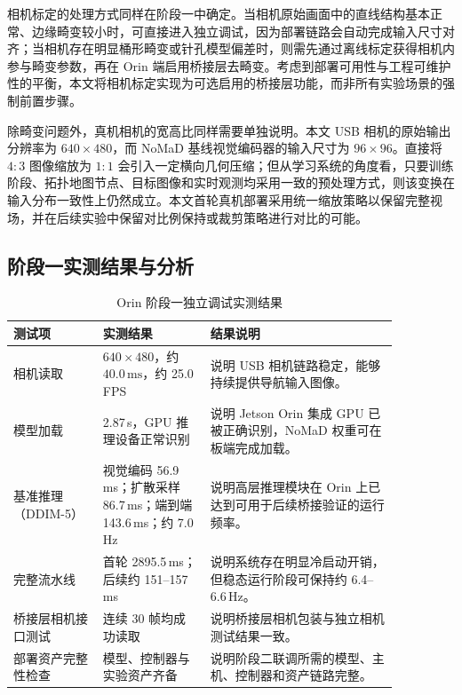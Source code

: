 相机标定的处理方式同样在阶段一中确定。当相机原始画面中的直线结构基本正常、边缘畸变较小时，可直接进入独立调试，因为部署链路会自动完成输入尺寸对齐；当相机存在明显桶形畸变或针孔模型偏差时，则需先通过离线标定获得相机内参与畸变参数，再在 Orin 端启用桥接层去畸变。考虑到部署可用性与工程可维护性的平衡，本文将相机标定实现为可选启用的桥接层功能，而非所有实验场景的强制前置步骤。

除畸变问题外，真机相机的宽高比同样需要单独说明。本文 USB 相机的原始输出分辨率为 $640\times480$，而 NoMaD 基线视觉编码器的输入尺寸为 $96\times96$。直接将 $4:3$ 图像缩放为 $1:1$ 会引入一定横向几何压缩；但从学习系统的角度看，只要训练阶段、拓扑地图节点、目标图像和实时观测均采用一致的预处理方式，则该变换在输入分布一致性上仍然成立。本文首轮真机部署采用统一缩放策略以保留完整视场，并在后续实验中保留对比例保持或裁剪策略进行对比的可能。

\subsection{阶段一实测结果与分析}


\begin{table}[htbp]
    \centering
    \caption{Orin 阶段一独立调试实测结果}
    \label{tab:orin-stage1-results}
    \begin{tabular}{p{0.20\linewidth}p{0.24\linewidth}p{0.42\linewidth}}
        \toprule
        测试项 & 实测结果 & 结果说明 \\
        \midrule
        相机读取 & $640\times480$，约 $40.0\,\mathrm{ms}$，约 25.0 FPS & 说明 USB
        相机链路稳定，能够持续提供导航输入图像。 \\
        模型加载 & 2.87\,s，GPU 推理设备正常识别 & 说明 Jetson Orin 集成 GPU 已被正确识别，NoMaD
        权重可在板端完成加载。 \\
        基准推理（DDIM-5） & 视觉编码 56.9\,ms；扩散采样 86.7\,ms；端到端 143.6\,ms；约 7.0\,Hz &
        说明高层推理模块在 Orin 上已达到可用于后续桥接验证的运行频率。 \\
        完整流水线 & 首轮 2895.5\,ms；后续约 151--157\,ms & 说明系统存在明显冷启动开销，但稳态运行阶段可保持约 6.4--
        6.6\,Hz。 \\
        桥接层相机接口测试 & 连续 30 帧均成功读取 & 说明桥接层相机包装与独立相机测试结果一致。 \\
        部署资产完整性检查 & 模型、控制器与实验资产齐备 & 说明阶段二联调所需的模型、主机、控制器和资产链路完整。 \\
        \bottomrule
    \end{tabular}
\end{table}

